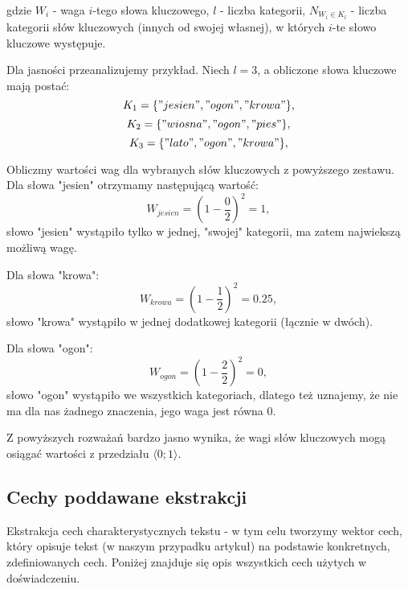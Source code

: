 \documentclass{classrep}
\begin{document}
gdzie $W_{i}$ - waga $i$-tego słowa kluczowego, $l$ - liczba kategorii, $N_{W_{i} \in K_{l}}$ - liczba kategorii słów kluczowych (innych od swojej własnej), w których $i$-te słowo kluczowe występuje. \newline

Dla jasności przeanalizujemy przykład. Niech $l = 3$, a obliczone słowa kluczowe mają postać:\newline
\begin{equation}
            K_{1} = \{{"jesien", "ogon", "krowa"}\},
\end{equation}
\begin{equation}
            K_{2} =\{{"wiosna", "ogon", "pies"}\},
\end{equation}	
\begin{equation}
            K_{3} = \{{"lato", "ogon", "krowa"}\},
\end{equation}	

Obliczmy wartości wag dla wybranych słów kluczowych z powyższego zestawu. Dla słowa "jesien" otrzymamy następującą wartość:
\begin{equation}
            W_{jesien} = \left({1 - \frac{0}{2}}\right)^2 = 1,
\end{equation}
słowo "jesien" wystąpiło tylko w jednej, "swojej" kategorii, ma zatem najwiekszą możliwą wagę.

Dla słowa "krowa":
\begin{equation}
            W_{krowa} = \left({1 - \frac{1}{2}}\right)^2 = 0.25,
\end{equation}
słowo "krowa" wystąpiło w jednej dodatkowej kategorii (łącznie w dwóch).

Dla słowa "ogon":
\begin{equation}
            W_{ogon} = \left({1 - \frac{2}{2}}\right)^2 = 0,
\end{equation}
słowo "ogon" wystąpiło we wszystkich kategoriach, dlatego też uznajemy, że nie ma dla nas żadnego znaczenia, jego waga jest równa 0. \newline

Z powyższych rozważań bardzo jasno wynika, że wagi słów kluczowych mogą osiągać wartości z przedziału $ \langle0;1\rangle $.


\subsection{Cechy poddawane ekstrakcji}

Ekstrakcja cech charakterystycznych tekstu - w tym celu tworzymy wektor cech, który opisuje tekst (w naszym przypadku artykuł) na podstawie konkretnych, zdefiniowanych cech. Poniżej znajduje się opis wszystkich cech użytych w doświadczeniu. \newline
\end{document}
